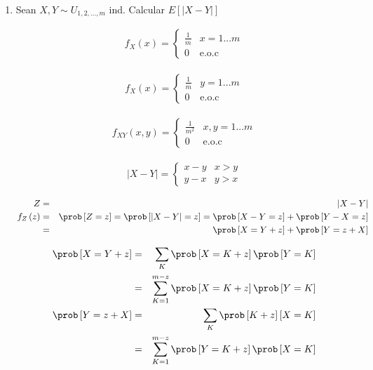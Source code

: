 \begin{enumerate}
\item Sean $X,Y \sim U_{1,2,..., m}$ ind. Calcular $E \left[|X-Y| \right]$

\begin{eqnarray*}
f_{X} \left(x \right) = \begin{cases}
\frac{1}{m}  & x=1... m\\
0 &  \textrm{e.o.c}
\end{cases}  
\end{eqnarray*}

\begin{eqnarray*}
f_{X} \left(x \right) = \begin{cases}
\frac{1}{m}  & y=1... m\\
0 &  \textrm{e.o.c}
\end{cases}  
\end{eqnarray*}

\begin{eqnarray*}
f_{XY} \left(x,y \right) = \begin{cases}
\frac{1}{m^2}  & x,y =1... m\\
0 &  \textrm{e.o.c}
\end{cases}  
\end{eqnarray*}

\begin{eqnarray*}
|X-Y| = \begin{cases}
x-y  & x>y \\
y-x  &  y>x
\end{cases}  
\end{eqnarray*}

\begin{eqnarray*}
Z &=&|X-Y|\\
f_{Z} \left( z \right) &=& \prob \left[Z=z \right]= \prob \left[ |X-Y|=z \right]= \prob \left[X-Y=z \right] + \prob \left[ Y-X=z \right]\\
&=& \prob \left[X= Y+z \right] + \prob \left[Y=z+X \right]
\end{eqnarray*}

\begin{eqnarray*}
\prob \left[ X= Y+z \right] &=& \sum _{K} \prob \left[X=K+z \right] \prob \left[Y=K \right]\\
&=& \sum_{K=1}^{m-z} \prob \left[X=K+z \right] \prob \left[ Y= K \right]\\
\prob \left[Y=z+X \right] &=& \sum _{K}  \prob \left[ K+z\right] \left[X=K \right]\\
&=& \sum_{K=1}^{m-z}\prob \left[ Y=K + z\right]  \prob \left[X=K \right]
\end{eqnarray*}


\end{enumerate}
